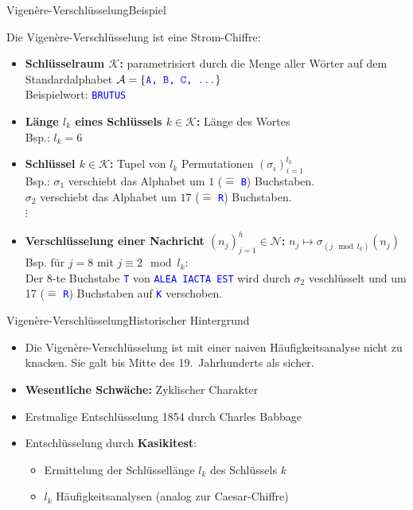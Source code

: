 \documentclass{beamer}
\newcommand{\mc}{\mathcal}
\newcommand{\tb}[1]{{\textcolor{blue}{#1}}}
\theoremstyle{plain}
\begin{document}
\begin{frame}{Vigenère-Verschlüsselung}{Beispiel}

 Die Vigenère-Verschlüsselung ist eine Strom-Chiffre: 
 
 \begin{itemize}[<+->]
  \item \textbf{Schlüsselraum $\mc K$:} parametrisiert durch die Menge aller Wörter auf dem Standardalphabet $\mc A = \{\text{\tb{\texttt{A, B, C, \dots}}}\}$  \\ Beispielwort: \tb{\texttt{BRUTUS}}
  \item \textbf{Länge $l_k$ eines Schlüssels $k \in \mc K$:} Länge des Wortes \\ Bsp.: $l_k = 6$
  \item \textbf{Schlüssel $k \in \mc K$:} Tupel von $l_k$ Permutationen $(\sigma_i)_{i=1}^{l_k}$ \\ 
  Bsp.: $\sigma_1$ verschiebt das Alphabet um $1$ ($\hat =$ \tb{\texttt{B}}) Buchstaben.\\
  \hspace{0.9cm}$\sigma_2$ verschiebt das Alphabet um $17$ ($\hat = $ \tb{\texttt{R}}) Buchstaben.\\
  \hspace{5cm}$\vdots$
  \item \textbf{Verschlüsselung einer Nachricht $(n_j)_{j=1}^h \in \mc N$:} $n_j \mapsto \sigma_{(j \mod l_k)}(n_j)$ \\ Bsp. für $j = 8$ mit $j \equiv 2 \mod l_k$: \\
  Der $8$-te Buchstabe \tb{\texttt{T}} von \tb{\texttt{ALEA IACTA EST}} wird durch $\sigma_2$ veschlüsselt und um 17 ($\hat = $ \tb{\texttt{R}}) Buchstaben auf \tb{\texttt{K}} verschoben.
 \end{itemize}
\end{frame}

\begin{frame}{Vigenère-Verschlüsselung}{Historischer Hintergrund}
\begin{itemize}
 \item Die Vigenère-Verschlüsselung ist mit einer naiven Häufigkeitsanalyse nicht zu knacken. Sie galt bis Mitte des 19.\ Jahrhunderts als sicher.
 \item \textbf{Wesentliche Schwäche:} Zyklischer Charakter \pause
 \item Erstmalige Entschlüsselung 1854 durch Charles Babbage
 \item Entschlüsselung durch \textbf{Kasikitest}:
 \begin{itemize}
 \item Ermittelung der Schlüssellänge $l_k$ des Schlüssels $k$
 \item $l_k$ Häufigkeitsanalysen (analog zur Caesar-Chiffre)
\end{itemize}
\end{itemize}
 
\end{frame}
\end{document}

